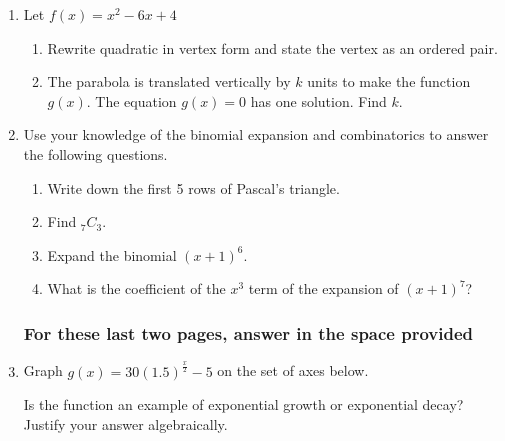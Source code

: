 \documentclass[12pt, oneside]{article}
\begin{document}
\begin{enumerate}
\item Let $f(x) = x^2-6x+4$
\begin{enumerate}
    \item Rewrite quadratic in vertex form and state the vertex as an ordered pair.
    \item The parabola is translated vertically by $k$ units to make the function $g(x)$. The equation $g(x)=0$ has one solution. Find $k$.
\end{enumerate}

\item Use your knowledge of the binomial expansion and combinatorics to answer the following questions.
\begin{enumerate}
    \item Write down the first 5 rows of Pascal's triangle.
    \item Find $_7C_3$.
    \item Expand the binomial $(x+1)^6$.
    \item What is the coefficient of the $x^3$ term of the expansion of $(x+1)^7$?
\end{enumerate}

\newpage
\subsubsection*{For these last two pages, answer in the space provided}

\item Graph $g(x)=30(1.5)^{\frac{x}{2}}-5$ on the set of axes below.
\begin{center}
\end{center} %
Is the function an example of exponential growth or exponential decay? Justify your answer algebraically.


\end{enumerate}
\end{document}
